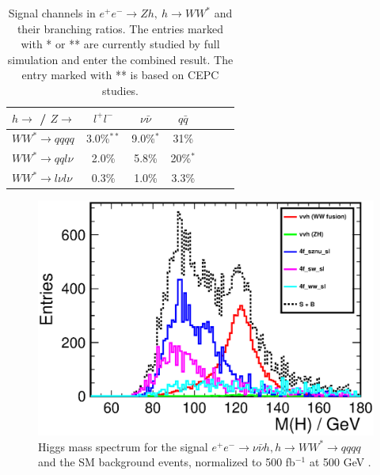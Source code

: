 \begin{table}
\begin{center}
\begin{tabular} {lcccccc}
$h\to$ / $Z\to$  & $l^+l^-$ &  $\nu\bar{\nu}$ & $q\bar{q}$ \\
\hline
$WW^*\to qqqq$        & 3.0\%$^{**}$    & 9.0\%$^{*}$   & 31\% \\
$WW^*\to qql\nu$      & 2.0\%    & 5.8\%    & 20\%$^{*}$ \\
$WW^*\to l\nu l\nu$   & 0.3\%    & 1.0\%    & 3.3\%
\end{tabular}
\caption{Signal channels in $e^+e^-\to Zh,~h\to WW^*$ and their branching ratios. 
The entries marked with * or ** are currently studied by full simulation and enter the combined result. 
The entry marked with ** is based on CEPC studies.}
\label{tab:ZhWWchannels}
\end{center}
\end{table}


\begin{figure}
\begin{center}
\includegraphics[width=0.85\hsize]{chapters/figures/vvH_WW4j500_MassH.eps}
\end{center}
  \caption{Higgs mass spectrum for the signal $e^+e^-\to\nu\bar\nu h, h\to WW^{*}\to qqqq$
  and the SM background events, normalized to 500 fb$^{-1}$
  at 500 GeV \cite{Durig:2014lfa}.}
  \label{fig:vvHWW500}
\end{figure}

